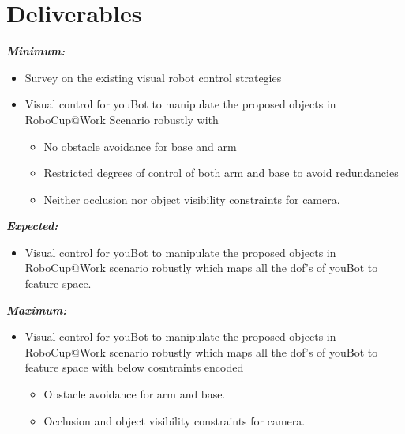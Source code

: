 
\section{Deliverables}

\textit{\textbf{Minimum:}}
\begin{itemize}
\item Survey on the existing visual robot control strategies
\item Visual control for youBot to manipulate the proposed objects in RoboCup@Work Scenario robustly with 
\begin{itemize}
\item No obstacle avoidance for base and arm
\item Restricted degrees of control of both arm and base to avoid redundancies
\item Neither occlusion nor object visibility constraints for camera.
\end{itemize}
\end{itemize}
\textit{\textbf{Expected:}}
\begin{itemize}
\item Visual control for youBot to manipulate the proposed objects in RoboCup@Work scenario robustly which maps all the dof's of youBot to feature space.
\end{itemize}       
\textit{\textbf{Maximum:}}
\begin{itemize}
\item Visual control for youBot to manipulate the proposed objects in RoboCup@Work scenario robustly which maps all the dof's of youBot to feature space with below cosntraints 
encoded
\begin{itemize}
\item Obstacle avoidance for arm and base.
\item Occlusion and object visibility constraints for camera.
\end{itemize}
\end{itemize}
